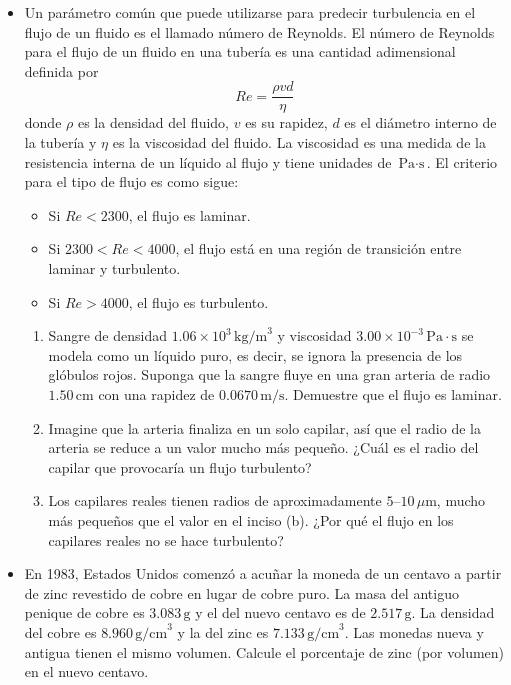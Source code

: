 \documentclass[11pt,a4paper]{article}
\begin{document}
\begin{itemize}
    \item[\textbf{38.}] Un parámetro común que puede utilizarse para predecir turbulencia en el flujo de un fluido es el llamado número de Reynolds. El número de Reynolds para el flujo de un fluido en una tubería es una cantidad adimensional definida por
    \[
    Re = \frac{\rho v d}{\eta}
    \]
    donde \(\rho\) es la densidad del fluido, \(v\) es su rapidez, \(d\) es el diámetro interno de la tubería y \(\eta\) es la viscosidad del fluido. La viscosidad es una medida de la resistencia interna de un líquido al flujo y tiene unidades de \(\text{Pa}\cdot\text{s}\). El criterio para el tipo de flujo es como sigue:
    \begin{itemize}
        \item Si \(Re < 2300\), el flujo es laminar.
        \item Si \(2300 < Re < 4000\), el flujo está en una región de transición entre laminar y turbulento.
        \item Si \(Re > 4000\), el flujo es turbulento.
    \end{itemize}
    \begin{enumerate}
        \item Sangre de densidad \(1.06 \times 10^3\,\text{kg/m}^3\) y viscosidad \(3.00 \times 10^{-3}\,\text{Pa}\cdot\text{s}\) se modela como un líquido puro, es decir, se ignora la presencia de los glóbulos rojos. Suponga que la sangre fluye en una gran arteria de radio \(1.50\,\text{cm}\) con una rapidez de \(0.0670\,\text{m/s}\). Demuestre que el flujo es laminar.
        \item Imagine que la arteria finaliza en un solo capilar, así que el radio de la arteria se reduce a un valor mucho más pequeño. ¿Cuál es el radio del capilar que provocaría un flujo turbulento?
        \item Los capilares reales tienen radios de aproximadamente \(5\text{–}10\,\mu\text{m}\), mucho más pequeños que el valor en el inciso (b). ¿Por qué el flujo en los capilares reales no se hace turbulento?
    \end{enumerate}
    \vspace*{8cm}
    
    \item[\textbf{39.}] En 1983, Estados Unidos comenzó a acuñar la moneda de un centavo a partir de zinc revestido de cobre en lugar de cobre puro. La masa del antiguo penique de cobre es \(3.083\,\text{g}\) y el del nuevo centavo es de \(2.517\,\text{g}\). La densidad del cobre es \(8.960\,\text{g/cm}^3\) y la del zinc es \(7.133\,\text{g/cm}^3\). Las monedas nueva y antigua tienen el mismo volumen. Calcule el porcentaje de zinc (por volumen) en el nuevo centavo.
    \vspace*{6cm}
    

\end{itemize}
\end{document}
